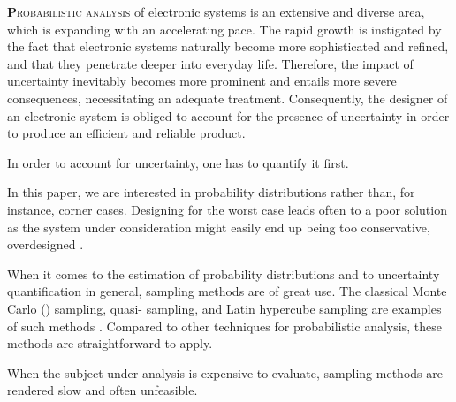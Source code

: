 \lettrine[findent=0.4em, nindent=0em]{\textbf{P}}{robabilistic analysis} of
electronic systems is an extensive and diverse area, which is expanding with an
accelerating pace. The rapid growth is instigated by the fact that electronic
systems naturally become more sophisticated and refined, and that they penetrate
deeper into everyday life. Therefore, the impact of uncertainty inevitably
becomes more prominent and entails more severe consequences, necessitating an
adequate treatment. Consequently, the designer of an electronic system is
obliged to account for the presence of uncertainty in order to produce an
efficient and reliable product.

In order to account for uncertainty, one has to quantify it first. 

 In this paper, we are interested in
probability distributions rather than, for instance, corner cases. Designing for
the worst case leads often to a poor solution as the system under consideration
might easily end up being too conservative, overdesigned \cite{quinton2012}.

When it comes to the estimation of probability distributions and to uncertainty
quantification in general, sampling methods are of great use. The classical
Monte Carlo () sampling, quasi- sampling, and Latin hypercube
sampling are examples of such methods \cite{asmussen2007}. Compared to other
techniques for probabilistic analysis, these methods are straightforward to
apply. 

 When the subject under analysis is expensive to
evaluate, sampling methods are rendered slow and often unfeasible.

